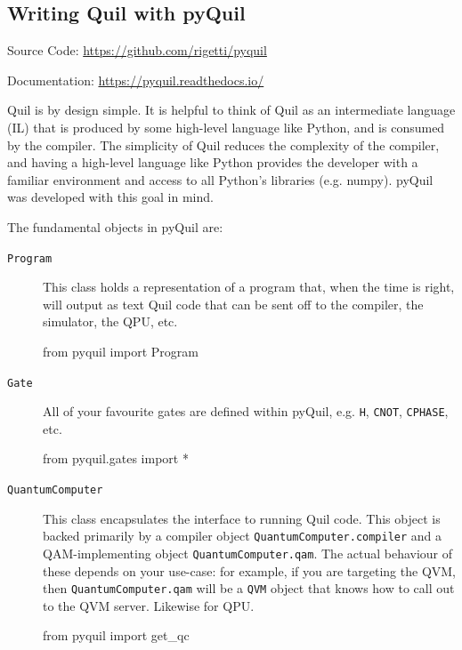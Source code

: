 \subsection{Writing Quil with pyQuil}
\begin{center}
Source Code: \url{https://github.com/rigetti/pyquil}

Documentation: \url{https://pyquil.readthedocs.io/}
\end{center}

Quil is by design simple. It is helpful to think of Quil as an intermediate language (IL) that is produced by some high-level language like Python, and is consumed by the compiler. The simplicity of Quil reduces the complexity of the compiler, and having a high-level language like Python provides the developer with a familiar environment and access to all Python's libraries (e.g. numpy). pyQuil was developed with this goal in mind.

The fundamental objects in pyQuil are:
\begin{description}
\item[\texttt{Program}] This class holds a representation of a program that, when the time is right, will output as text Quil code that can be sent off to the compiler, the simulator, the QPU, etc.
\begin{python}
from pyquil import Program
\end{python}
\item[\texttt{Gate}] All of your favourite gates are defined within pyQuil, e.g. \texttt{H}, \texttt{CNOT}, \texttt{CPHASE}, etc. 
\begin{python}
from pyquil.gates import *
\end{python}
\item[\texttt{QuantumComputer}] This class encapsulates the interface to running Quil code. This object is backed primarily by a compiler object \texttt{QuantumComputer.compiler} and a QAM-implementing object \texttt{QuantumComputer.qam}. The actual behaviour of these depends on your use-case: for example, if you are targeting the QVM, then \texttt{QuantumComputer.qam} will be a \texttt{QVM} object that knows how to call out to the QVM server. Likewise for QPU.
\begin{python}
from pyquil import get_qc
\end{python}
\end{description}

